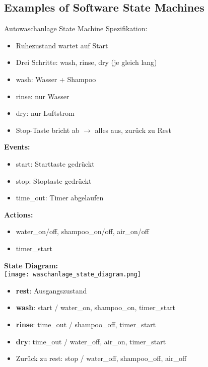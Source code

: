 \subsection{Examples of Software State Machines}


\begin{example2}{Autowaschanlage State Machine}
    Spezifikation:
    \begin{itemize}
        \item Ruhezustand wartet auf Start
        \item Drei Schritte: wash, rinse, dry (je gleich lang)
        \item wash: Wasser + Shampoo
        \item rinse: nur Wasser  
        \item dry: nur Luftstrom
        \item Stop-Taste bricht ab $\rightarrow$ alles aus, zurück zu Rest
    \end{itemize}
    
    \tcblower
    
    \textbf{Events:}
    \begin{itemize}
        \item start: Starttaste gedrückt
        \item stop: Stoptaste gedrückt
        \item time\_out: Timer abgelaufen
    \end{itemize}
    
    \textbf{Actions:}
    \begin{itemize}
        \item water\_on/off, shampoo\_on/off, air\_on/off
        \item timer\_start
    \end{itemize}
    
    \textbf{State Diagram:}\\
    \texttt{[image: waschanlage\_state\_diagram.png]}
    \begin{itemize}
        \item \textbf{rest}: Ausgangszustand
        \item \textbf{wash}: start / water\_on, shampoo\_on, timer\_start
        \item \textbf{rinse}: time\_out / shampoo\_off, timer\_start
        \item \textbf{dry}: time\_out / water\_off, air\_on, timer\_start
        \item Zurück zu rest: stop / water\_off, shampoo\_off, air\_off
    \end{itemize}
\end{example2}

